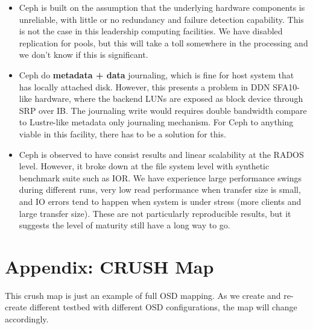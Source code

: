 \documentclass{article}
\begin{document}
\begin{itemize}

  \item Ceph is built on the assumption that the underlying hardware components
  is unreliable, with little or no redundancy and failure detection capability.
  This is not the case in this leadership computing facilities. We have disabled
  replication for pools, but this will take a toll somewhere in the processing
  and we don't know if this is significant.

  \item Ceph do \textbf{metadata + data} journaling, which is fine for host
  system that has locally attached disk. However, this presents a problem in DDN
  SFA10-like hardware, where the backend LUNs are exposed as block device
  through SRP over IB. The journaling write would requires double bandwidth
  compare to Lustre-like metadata only journaling mechanism. For Ceph to anything
  viable in this facility, there has to be a solution for this.

  \item Ceph is observed to have consist results and linear scalability at the
  RADOS level. However, it broke down at the file system level with synthetic
  benchmark suite such as IOR. We have experience large performance swings
  during different runs, very low read performance when transfer size is small,
  and IO errors tend to happen when system is under stress (more clients and
  large transfer size). These are not particularly reproducible results, but it
  suggests the level of maturity still have a long way to go.
  
\end{itemize}

\section*{Appendix: CRUSH Map}

This crush map is just an example of full OSD mapping. As we create and
re-create different testbed with different OSD configurations, the map will
change accordingly.


\end{document}

